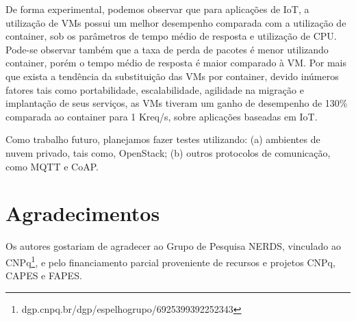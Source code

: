 \documentclass{sbrt}
\begin{document}
De forma experimental, podemos observar que para aplicações de IoT, a utilização de VMs possui um melhor desempenho comparada com a utilização de container, sob os parâmetros de tempo médio de resposta e utilização de CPU. Pode-se observar também que a taxa de perda de pacotes é menor utilizando container, porém o tempo médio de resposta é maior comparado à VM. Por mais que exista a tendência da substituição das VMs por container, devido inúmeros fatores tais como portabilidade, escalabilidade, agilidade na migração e implantação de seus serviços, as VMs tiveram um ganho de desempenho de 130{\%} comparada ao container para 1 Kreq/s, sobre aplicações baseadas em IoT.

Como trabalho futuro, planejamos fazer testes utilizando: (a) ambientes de nuvem privado, tais como, OpenStack; (b) outros protocolos de comunicação, como MQTT e CoAP.


\section*{Agradecimentos}
Os autores gostariam de agradecer ao Grupo de Pesquisa NERDS, vinculado ao CNPq\footnote{dgp.cnpq.br/dgp/espelhogrupo/6925399392252343}, e pelo financiamento parcial proveniente de recursos e projetos CNPq, CAPES e FAPES.
\end{document}
